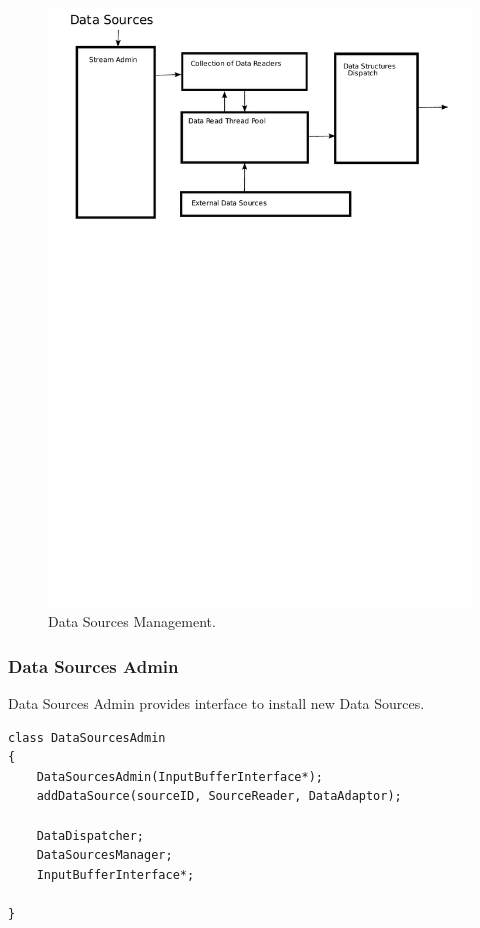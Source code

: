 \documentclass[14pt]{article}
\begin{document}
\begin{figure}
  \includegraphics[width=5.00in]{../figures/DataSources.pdf}
  \caption{Data Sources Management.}
  \label{DataSourcePic}
\end{figure}

\subsubsection{Data Sources Admin}

Data Sources Admin provides interface to install new Data Sources.

\begin{verbatim}
class DataSourcesAdmin
{
	DataSourcesAdmin(InputBufferInterface*);
    addDataSource(sourceID, SourceReader, DataAdaptor);

	DataDispatcher;
    DataSourcesManager;
	InputBufferInterface*;

}
\end{verbatim}
 
\end{document}
